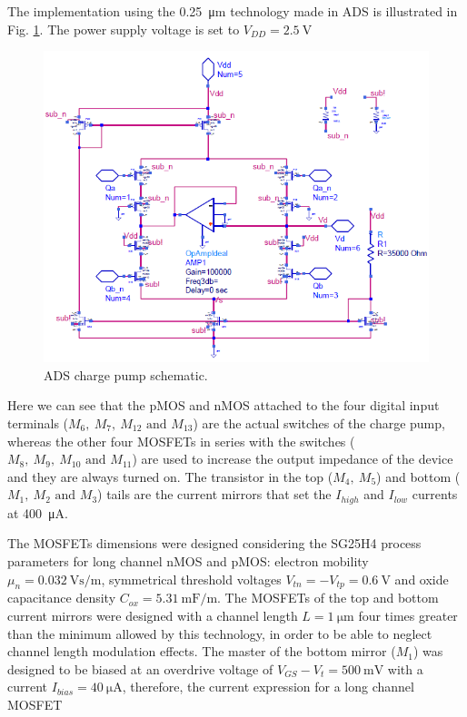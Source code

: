 \documentclass[lettersize,journal]{IEEEtran}
\begin{document}
The implementation using the \qty{0.25}{\micro\meter} technology made in ADS is illustrated in Fig. \ref{fig:cp_ads_schematic}. The power supply voltage is set to $V_{DD}=\qty{2.5}{\volt}$

\begin{figure}[!ht]
    \centering
    \includegraphics[width=1.0\linewidth]{images/block_design/CP/cp_schematic_ads.png}
    \caption{ADS charge pump schematic.}
    \label{fig:cp_ads_schematic}
\end{figure}

Here we can see that the pMOS and nMOS attached to the four digital input terminals ($M_6,\ M_7,\ M_{12}\text{ and }M_{13}$) are the actual switches of the charge pump, whereas the other four MOSFETs in series with the switches ($M_8,\ M_9,\ M_{10}\text{ and }M_{11}$) are used to increase the output impedance of the device and they are always turned on. The transistor in the top ($M_4,\ M_5$) and bottom ($M_1,\ M_2 \text{ and } M_3$) tails are the current mirrors that set the \(I_{high}\) and \(I_{low}\) currents at \qty{400}{\micro\ampere}.

The MOSFETs dimensions were designed considering the SG25H4 process parameters for long channel nMOS and pMOS: electron mobility \(\mu_n=\qty[per-mode=symbol]{0.032}{\volt\second\per\meter}\), symmetrical threshold voltages \(V_{tn}=-V_{tp}=\qty{0.6}{\volt}\) and oxide capacitance density \(C_{ox}=\qty[per-mode=symbol]{5.31}{\milli\farad\per\meter}\). The MOSFETs of the top and bottom current mirrors were designed with a channel length \(L=\qty{1}{\micro\meter}\) four times greater than the minimum allowed by this technology, in order to be able to neglect channel length modulation effects. The master of the bottom mirror ($M_1$) was designed to be biased at an overdrive voltage of \(V_{GS}-V_{t}=\qty{500}{\milli\volt}\) with a current \(I_{bias}=\qty{40}{\micro\ampere}\), therefore, the current expression for a long channel MOSFET
\end{document}

